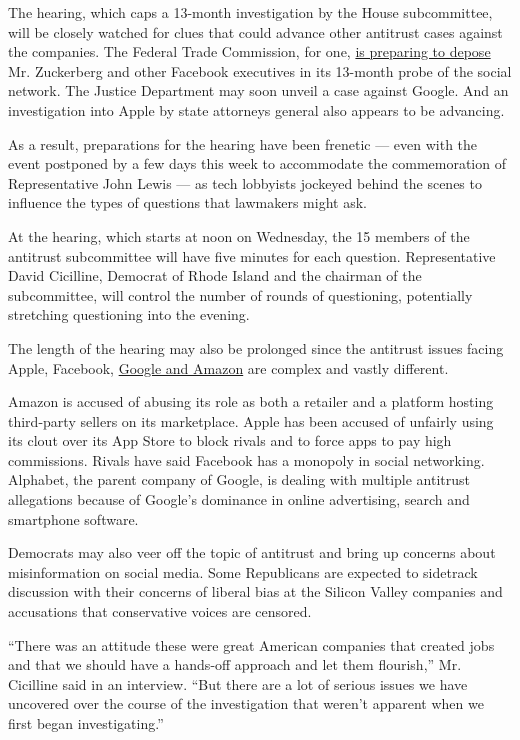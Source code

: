 The hearing, which caps a 13-month investigation by the House
subcommittee, will be closely watched for clues that could advance other
antitrust cases against the companies. The Federal Trade Commission, for
one,
\href{https://www.nytimes3xbfgragh.onion/2020/07/17/technology/ftc-facebook-investigation.html}{is
preparing to depose} Mr. Zuckerberg and other Facebook executives in its
13-month probe of the social network. The Justice Department may soon
unveil a case against Google. And an investigation into Apple by state
attorneys general also appears to be advancing.

As a result, preparations for the hearing have been frenetic --- even
with the event postponed by a few days this week to accommodate the
commemoration of Representative John Lewis --- as tech lobbyists
jockeyed behind the scenes to influence the types of questions that
lawmakers might ask.

At the hearing, which starts at noon on Wednesday, the 15 members of the
antitrust subcommittee will have five minutes for each question.
Representative David Cicilline, Democrat of Rhode Island and the
chairman of the subcommittee, will control the number of rounds of
questioning, potentially stretching questioning into the evening.

The length of the hearing may also be prolonged since the antitrust
issues facing Apple, Facebook,
\href{https://www.nytimes3xbfgragh.onion/2019/06/02/business/google-antitrust-investigation.html}{Google
and Amazon} are complex and vastly different.

Amazon is accused of abusing its role as both a retailer and a platform
hosting third-party sellers on its marketplace. Apple has been accused
of unfairly using its clout over its App Store to block rivals and to
force apps to pay high commissions. Rivals have said Facebook has a
monopoly in social networking. Alphabet, the parent company of Google,
is dealing with multiple antitrust allegations because of Google's
dominance in online advertising, search and smartphone software.

Democrats may also veer off the topic of antitrust and bring up concerns
about misinformation on social media. Some Republicans are expected to
sidetrack discussion with their concerns of liberal bias at the Silicon
Valley companies and accusations that conservative voices are censored.

``There was an attitude these were great American companies that created
jobs and that we should have a hands-off approach and let them
flourish,'' Mr. Cicilline said in an interview. ``But there are a lot of
serious issues we have uncovered over the course of the investigation
that weren't apparent when we first began investigating.''

